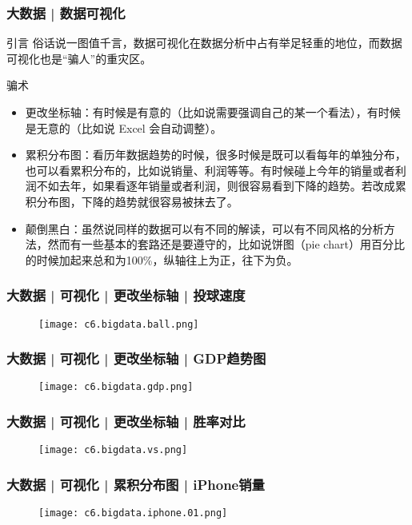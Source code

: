 \begin{frame}
  \frametitle{大数据 | 数据可视化}
  \begin{block}{引言}
    俗话说一图值千言，数据可视化在数据分析中占有举足轻重的地位，而数据可视化也是“骗人”的重灾区。
  \end{block}
  \vspace{-0.5em}
  \pause
  \begin{block}{骗术}
    \begin{itemize}
      \item 更改坐标轴：有时候是有意的（比如说需要强调自己的某一个看法），有时候是无意的（比如说 Excel 会自动调整）。
      \item 累积分布图：看历年数据趋势的时候，很多时候是既可以看每年的单独分布，也可以看累积分布的，比如说销量、利润等等。有时候碰上今年的销量或者利润不如去年，如果看逐年销量或者利润，则很容易看到下降的趋势。若改成累积分布图，下降的趋势就很容易被抹去了。
      \item 颠倒黑白：虽然说同样的数据可以有不同的解读，可以有不同风格的分析方法，然而有一些基本的套路还是要遵守的，比如说饼图（pie chart）用百分比的时候加起来总和为100\%，纵轴往上为正，往下为负。
    \end{itemize}
  \end{block}
\end{frame}

\begin{frame}
  \frametitle{大数据 | 可视化 | 更改坐标轴 | 投球速度}
  \begin{figure}
    \centering
    \texttt{[image: c6.bigdata.ball.png]}
  \end{figure}
\end{frame}

\begin{frame}
  \frametitle{大数据 | 可视化 | 更改坐标轴 | GDP趋势图}
  \begin{figure}
    \centering
    \texttt{[image: c6.bigdata.gdp.png]}
  \end{figure}
\end{frame}

\begin{frame}
  \frametitle{大数据 | 可视化 | 更改坐标轴 | 胜率对比}
  \begin{figure}
    \centering
    \texttt{[image: c6.bigdata.vs.png]}
  \end{figure}
\end{frame}

\begin{frame}
  \frametitle{大数据 | 可视化 | 累积分布图 | iPhone销量}
  \begin{figure}
    \centering
    \texttt{[image: c6.bigdata.iphone.01.png]}
  \end{figure}
\end{frame}


